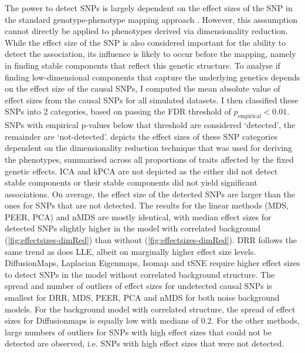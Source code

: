 The power to detect SNPs is largely dependent on the effect sizes of the SNP in the standard genotype-phenotype mapping approach \red{\citep{}}. However, this asssumption cannot directly be applied to phenotypes derived via dimensionality reduction. While the effect size of the SNP is also considered important for the ability to detect the association, its influence is likely to occur before the mapping, namely in finding stable components that reflect this genetic structure. To analyse if finding low-dimensional components that capture the underlying genetics depends on the effect size of the causal SNPs, I computed the mean absolute value of effect sizes from the causal SNPs for all simulated datasets. I then classified these SNPs into \num{2} categories, based on passing the FDR threshold of \(p_\text{empirical} < 0.01\). SNPs with empirical p-values below that threshold are considered `detected', the remainder are `not-detected'.  depicts the effect sizes of these SNP categories dependent on the dimensionality reduction technique that was used for deriving the phenotypes, summarised across all proportions of traits affected by the fixed genetic effects. ICA and kPCA are not depicted as the either did not detect stable components or their stable components did not yield significant associations. On average, the effect size of the detected SNPs are larger than the ones for SNPs that are not detected. The results for the linear methods (MDS, PEER, PCA) and nMDS are mostly identical, with median effect sizes for detected SNPs slightly higher in the model with correlated background (\cref{fig:effectsizes-dimRed}) than without (\cref{fig:effectsizes-dimRed}). DRR follows the same trend as does LLE, albeit on marginally higher effect size levels. DiffusionMaps, Laplacian Eigenmaps, Isomap and tSNE require higher effect sizes to detect SNPs in the model without correlated background structure. The spread and number of outliers of effect sizes for undetected causal SNPs is smallest for DRR, MDS, PEER, PCA and nMDS for both noise background models. For the background model with correlated structure, the spread of effect sizes for Diffusionmaps is equally low with medians of \num{0.2}. For the other methods, large numbers of outliers for SNPs with high effect sizes that could not be detected are observed, i.e. SNPs with high effect sizes that were not detected.

 


